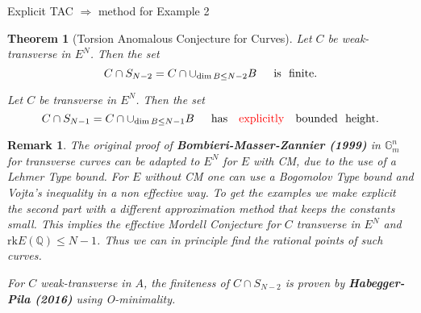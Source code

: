 \documentclass[handout]{beamer}
\newtheorem{thm}{Theorem}
\newtheorem{remark}{Remark}
\begin{document}
\begin{frame}{Explicit TAC $\Rightarrow$ method for Example 2}

\pause
\begin{thm}[Torsion Anomalous Conjecture for Curves]

Let $C$ be weak-transverse in $E^N$. Then the set  $$C\cap S_{N-2}=C\cap \cup_{\dim B\le N- 2}B \,\,\,\,\,\,\,\,\,{\rm is\,\,\,\,finite}.$$

Let $C$ be transverse in $E^N$. Then the set  $$C\cap S_{N-1}=C\cap \cup_{\dim B\le N-1 }B \,\,\,\,\,\,\,\,\,{\rm has \quad \textcolor{red}{explicitly} \quad bounded\,\,\,\,height}.$$


\end{thm}
\pause
\begin{remark}
The original proof of {\bf  Bombieri-Masser-Zannier (1999)} in $\mathbb{G}_m^n$ for transverse curves can be adapted to $E^N$ for $E$ with CM, due to the use of a Lehmer Type bound.
For $E$ without CM one can use a Bogomolov Type bound and Vojta's inequality in a non effective way. 
To get the examples we make explicit the second part with a different approximation method that keeps the constants small. 
This implies  the effective Mordell Conjecture  for  $C$  transverse in $E^N$ and $\mathrm{rk} E(\mathbb{Q})\le N-1$. Thus we can in principle find the rational points of such curves. 

For $C$ weak-transverse in $A$, the finiteness of $C\cap S_{N-2}$ is proven by {\bf Habegger-Pila (2016)} using O-minimality.
\end{remark}

\end{frame}
\end{document}
